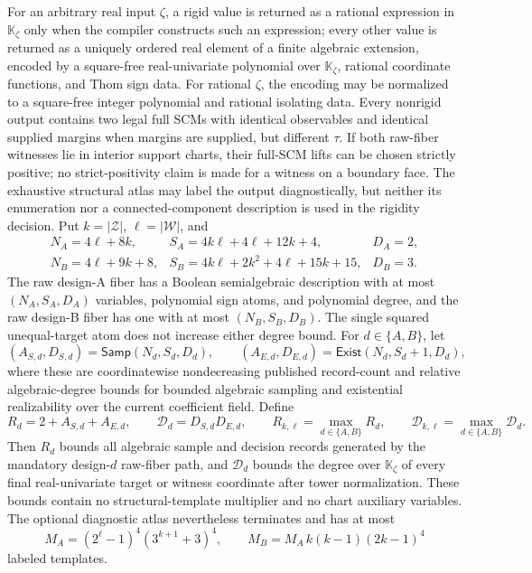 For an arbitrary real input \(\zeta\), a rigid value is returned as a rational expression in \(\mathbb K_{\zeta}\) only when the compiler constructs such an expression; every other value is returned as a uniquely ordered real element of a finite algebraic extension, encoded by a square-free real-univariate polynomial over \(\mathbb K_{\zeta}\), rational coordinate functions, and Thom sign data.  For rational \(\zeta\), the encoding may be normalized to a square-free integer polynomial and rational isolating data.  Every nonrigid output contains two legal full SCMs with identical observables and identical supplied margins when margins are supplied, but different \(\tau\).  If both raw-fiber witnesses lie in interior support charts, their full-SCM lifts can be chosen strictly positive; no strict-positivity claim is made for a witness on a boundary face.  The exhaustive structural atlas may label the output diagnostically, but neither its enumeration nor a connected-component description is used in the rigidity decision.
Put \(k=|\mathcal Z|\), \(\ell=|\mathcal W|\), and
\[
\begin{array}{lll}
N_A=4\ell+8k,&
S_A=4k\ell+4\ell+12k+4,&
D_A=2,\\
N_B=4\ell+9k+8,&
S_B=4k\ell+2k^2+4\ell+15k+15,&
D_B=3.
\end{array}
\]
The raw design-A fiber has a Boolean semialgebraic description with at most \((N_A,S_A,D_A)\) variables, polynomial sign atoms, and polynomial degree, and the raw design-B fiber has one with at most \((N_B,S_B,D_B)\).  The single squared unequal-target atom does not increase either degree bound.  For \(d\in\{A,B\}\), let
\[
(A_{S,d},D_{S,d})=\mathsf{Samp}(N_d,S_d,D_d),
\qquad
(A_{E,d},D_{E,d})=\mathsf{Exist}(N_d,S_d+1,D_d),
\]
where these are coordinatewise nondecreasing published record-count and relative algebraic-degree bounds for bounded algebraic sampling and existential realizability over the current coefficient field.  Define
\[
R_d=2+A_{S,d}+A_{E,d},
\qquad
\mathcal D_d=D_{S,d}D_{E,d},
\qquad
R_{k,\ell}=\max_{d\in\{A,B\}}R_d,
\qquad
\mathcal D_{k,\ell}=\max_{d\in\{A,B\}}\mathcal D_d.
\]
Then \(R_d\) bounds all algebraic sample and decision records generated by the mandatory design-\(d\) raw-fiber path, and \(\mathcal D_d\) bounds the degree over \(\mathbb K_{\zeta}\) of every final real-univariate target or witness coordinate after tower normalization.  These bounds contain no structural-template multiplier and no chart auxiliary variables.  The optional diagnostic atlas nevertheless terminates and has at most
\[
M_A=(2^{\ell}-1)^4(3^{k+1}+3)^4,
\qquad
M_B=M_A\,k(k-1)(2k-1)^4
\]
labeled templates.

